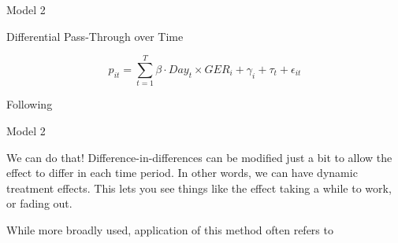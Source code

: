 



\begin{frame}{Model 2}




\begin{block}{Differential Pass-Through over Time}

\begin{equation}
\label{eq:Diff_DiD}
p_{it} = \sum_{t=1}^{T} \beta \cdot Day_{t} \times GER_{i} + \gamma_{i} + \tau_{t} + \epsilon_{it}
\end{equation}

Following \textcite{Frondel2024}

\end{block}


    
\end{frame}









\begin{frame}{Model 2}


We can do that! Difference-in-differences can be modified just a bit to allow the effect to differ in each time period. In other words, we can have dynamic treatment effects. This lets you see things like the effect taking a while to work, or fading out.

While more broadly used, application of this method often refers to \textcite{Autor2001}


    
\end{frame}



